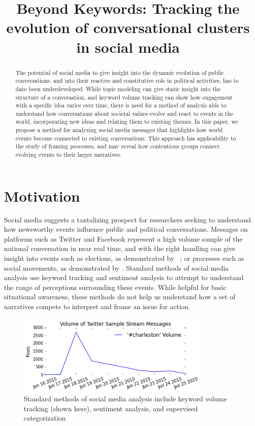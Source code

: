 \documentclass[12pt]{article}
\title{Beyond Keywords: Tracking the evolution of conversational clusters in social media}
\begin{document}
\maketitle

\begin{abstract}
   The potential of social media to give insight into the dynamic evolution of public conversations, and into their reactive and constitutive role in political activities, has to date been underdeveloped. While topic modeling can give static insight into the structure of a conversation, and keyword volume tracking can show how engagement with a specific idea varies over time, there is need for a method of analysis able to understand how conversations about societal values evolve and react to events in the world, incorporating new ideas and relating them to existing themes. In this paper, we propose a method for analyzing social media messages that highlights how world events become connected to existing conversations. This approach has applicability to the study of framing processes, and may reveal how contentious groups connect evolving events to their larger narratives.
\end{abstract}

\doublespacing

\section{Motivation}
	Social media suggests a tantalizing prospect for researchers seeking to understand how newsworthy events influence public and political conversations. Messages on platforms such as Twitter and Facebook represent a high volume sample  of the national conversation in near real time, and with the right handling can give insight into events such as elections, as demonstrated by ~\cite{Huberty2013,Tumasjan2010}; or processes such as social movements, as demonstrated by \cite{Agarwal2014,DiGrazia2015}. 
Standard methods of social media analysis use keyword tracking and sentiment analysis to attempt to understand the range of perceptions surrounding these events. 
While helpful for basic situational awareness, these methods do not help us understand how a set of narratives compete to interpret and frame an issue for action.

\begin{figure}[!ht]
  \centering
    \includegraphics[width=0.85\textwidth]{F1_keyword_volume.png}
    \caption{Standard methods of social media analysis  include keyword volume tracking (shown here),  sentiment analysis, and supervised categorization}
  \label{fig:keyword_vol}
\end{figure}
\end{document}
